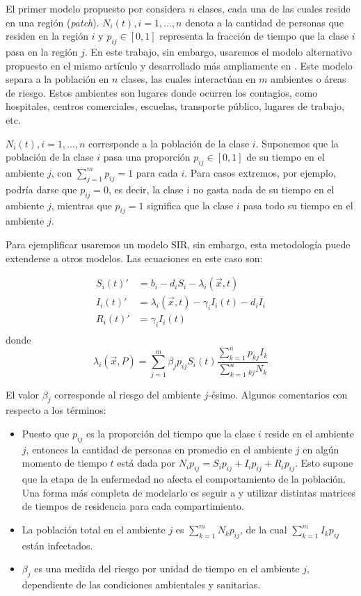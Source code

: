 El primer modelo propuesto por \cite{Bichara2015} considera \(n\) clases, cada una de las cuales reside en una región (\textit{patch}). \(N_i(t), i = 1, \dots, n\) denota a la cantidad de personas que residen en la región \(i\) y \(p_{ij} \in [0,1]\) representa la fracción de tiempo que la clase \(i\) pasa en la región \(j\). En este trabajo, sin embargo, usaremos el modelo alternativo propuesto en el mismo artículo y desarrollado más ampliamente en \cite{Bichara2018}. Este modelo separa a la población en \(n\) clases, las cuales interactúan en \(m\) ambientes o áreas de riesgo. Estos ambientes son lugares donde ocurren los contagios, como hospitales, centros comerciales, escuelas, transporte público, lugares de trabajo, etc.

\(N_i(t), i = 1, \dots, n\) corresponde a la población de la clase \(i\). Suponemos que la población de la clase \(i\) pasa una proporción \(p_{ij} \in [0,1]\) de su tiempo en el ambiente \(j\), con \(\sum_{j = 1}^{m} p_{ij} = 1\) para cada \(i\). Para casos extremos, por ejemplo, podría darse que \(p_{ij} = 0\), es decir, la clase \(i\) no gasta nada de su tiempo en el ambiente \(j\), mientras que \(p_{ij} = 1\) significa que la clase \(i\) pasa todo su tiempo en el ambiente \(j\). 

Para ejemplificar usaremos un modelo SIR, sin embargo, esta metodología puede extenderse a otros modelos. Las ecuaciones en este caso son:

\[
\begin{aligned}
S_i(t)' &=  b_i - d_iS_i - {\lambda_i(\vec{x}, t) } \\
I_i(t)' &= {\lambda_i(\vec{x}, t) } - \gamma_i I_i(t) - d_iI_i\\
R_i(t)' &= \gamma_i I_i(t)\\ 
\end{aligned}
\]
donde 
\[\lambda_i(\vec{x}, P) = \sum_{j=1}^m \beta_{j}p_{ij}S_i(t)\frac{\sum_{k=1}^{n}p_{kj} I_k}{\sum_{k=1}^{n}_{kj}N_k}\]

El valor \(\beta_j\) corresponde al riesgo del ambiente \(j\)-ésimo. Algunos comentarios con respecto a los términos: 

\begin{itemize}
\item Puesto que \(p_{ij}\) es la proporción del tiempo que la clase \(i\) reside en el ambiente \(j\), entonces la cantidad de personas en promedio en el ambiente \(j\) en algún momento de tiempo \(t\) está dada por \(N_i p_{ij} = S_i p_{ij} + I_i p_{ij} + R_i p_{ij}\). Esto supone que la etapa de la enfermedad no afecta el comportamiento de la población. Una forma más completa de modelarlo es seguir a \cite{Bichara2018} y utilizar distintas matrices de tiempos de residencia para cada compartimiento.
\item La población total en el ambiente \(j\) es \(\sum_{k = 1}^m N_k p_{ij}\), de la cual \(\sum_{k = 1}^m I_k p_{ij}\) están infectados.
\item \(\beta_j\) es una medida del riesgo por unidad de tiempo en el ambiente \(j\), dependiente de las condiciones ambientales y sanitarias.
\end{itemize}

